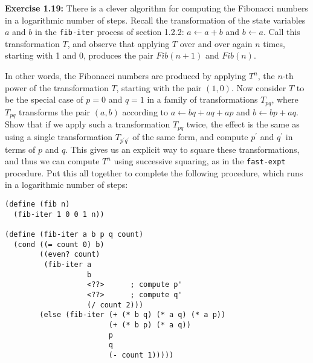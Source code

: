 \documentclass{article}
\begin{document}

\noindent \textbf{Exercise 1.19:} There is a clever algorithm for computing the
Fibonacci numbers in a logarithmic number of steps.  Recall the transformation
of the state variables $a$ and $b$ in the \lstinline{fib-iter} process of
section 1.2.2: $a \leftarrow a + b$ and $b \leftarrow a$.  Call this
transformation $T$, and observe that applying $T$ over and over again $n$ times,
starting with 1 and 0, produces the pair $\mathit{Fib}(n + 1)$ and
$\mathit{Fib}(n)$.

In other words, the Fibonacci numbers are produced by applying $T^n$, the $n$-th
power of the transformation $T$, starting with the pair $(1,0)$.  Now consider
$T$ to be the special case of $p = 0$ and $q = 1$ in a family of transformations
$T_{pq}$, where $T_{pq}$ transforms the pair $(a,b)$ according to
$a \leftarrow bq + aq + ap$ and $b \leftarrow bp + aq$.  Show that if we apply
such a transformation $T_{pq}$ twice, the effect is the same as using a single
transformation $T_{p^{\prime}q^{\prime}}$ of the same form, and compute
$p^{\prime}$ and $q^{\prime}$ in terms of $p$ and $q$.  This gives us an
explicit way to square these transformations, and thus we can compute $T^n$
using successive squaring, as in the \lstinline{fast-expt} procedure.  Put this
all together to complete the following procedure, which runs in a logarithmic
number of steps:

\vspace{5mm}
\begin{lstlisting}[style=scheme]
(define (fib n)
  (fib-iter 1 0 0 1 n))

(define (fib-iter a b p q count)
  (cond ((= count 0) b)
        ((even? count)
         (fib-iter a
                   b
                   <??>      ; compute p'
                   <??>      ; compute q'
                   (/ count 2)))
        (else (fib-iter (+ (* b q) (* a q) (* a p))
                        (+ (* b p) (* a q))
                        p
                        q
                        (- count 1)))))
\end{lstlisting}

\vspace{10mm}



\end{document}
